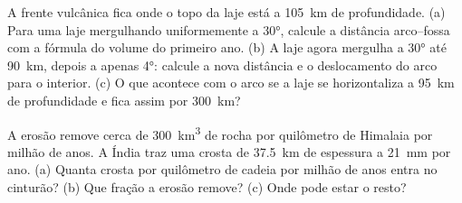 \begin{exercise}[$\star\star\star$]\label{exo:b2:himalaya-andes:11}
A frente vulcânica fica onde o topo da laje está a \qty{105}{km} de profundidade. (a) Para uma laje
mergulhando uniformemente a \ang{30}, calcule a distância arco--fossa com a fórmula do volume do primeiro
ano. (b) A laje agora mergulha a \ang{30} até \qty{90}{km}, depois a apenas \ang{4}: calcule
a nova distância e o deslocamento do arco para o interior. (c) O que acontece com o arco se a laje se horizontaliza
a \qty{95}{km} de profundidade e fica assim por \qty{300}{km}?
\end{exercise}

\begin{exercise}[$\star\star\star$]\label{exo:b2:himalaya-andes:12}
A erosão remove cerca de \qty{300}{km^3} de rocha por quilômetro de Himalaia por milhão de anos.
A Índia traz uma crosta de \qty{37.5}{km} de espessura a \qty{21}{mm} por ano. (a) Quanta crosta por
quilômetro de cadeia por milhão de anos entra no cinturão? (b) Que fração a erosão remove?
(c) Onde pode estar o resto?
\end{exercise}

